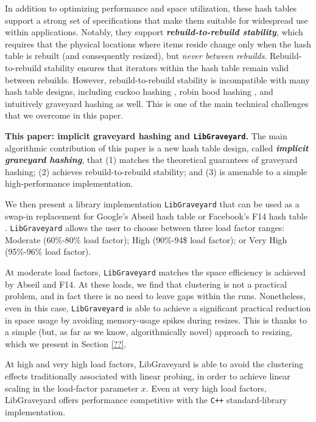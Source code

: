 \documentclass[10pt]{article}
\theoremstyle{remark}
\theoremstyle{remark}
\newcommand{\defn}[1]{\textbf{\emph{#1}}}
\renewcommand{\paragraph}[1]{\vspace{.2 cm} \noindent \textbf{#1}}
\begin{document}
In addition to optimizing performance and space utilization, these hash tables support a strong set of specifications that make them suitable for widespread use within applications. Notably, they support \defn{rebuild-to-rebuild stability}, which requires that the physical locations where items reside change only when the hash table is rebuilt (and consequently resized), but \emph{never between rebuilds}. Rebuild-to-rebuild stability ensures that iterators within the hash table remain valid between rebuilds. However, rebuild-to-rebuild stability is incompatible with many hash table designs, including cuckoo hashing \cite{}, robin hood hashing \cite{?}, and intuitively graveyard hashing as well. This is one of the main technical challenges that we overcome in this paper.

\paragraph{This paper: implicit graveyard hashing and \texttt{LibGraveyard}.} 
The main algorithmic contribution of this paper is a new hash table design, called \defn{implicit graveyard hashing}, that (1) matches the theoretical guarantees of graveyard hashing; (2) achieves rebuild-to-rebuild stability; and (3) is amenable to a simple high-performance implementation. 

We then present a library implementation \texttt{LibGraveyard} that can be used as a swap-in replacement for Google's Abseil hash table \cite{??} or Facebook's F14 hash table \cite{??}. \texttt{LibGraveyard} allows the user to choose between three load factor ranges: Moderate (60\%-80\% load factor); High (90\%-94\$ load factor); or Very High (95\%-96\% load factor).

At moderate load factors, \texttt{LibGraveyard} matches the space efficiency is achieved by  Abseil and F14. At these loads, we find that clustering is not a practical problem, and in fact there is no need to leave gaps within the runs. Nonetheless, even in this case, \texttt{LibGraveyard} is able to achieve a significant practical reduction in space usage by avoiding memory-usage spikes during resizes. This is thanks to a simple (but, as far as we know, algorithmically novel) approach to resizing, which we present in Section \ref{??}.

At high and very high load factors, LibGraveyard is able to avoid the clustering effects traditionally associated with linear probing, in order to achieve linear scaling in the load-factor parameter $x$. Even at very high load factors, LibGraveyard offers performance competitive with the \texttt{C++} standard-library implementation. 
\end{document}
